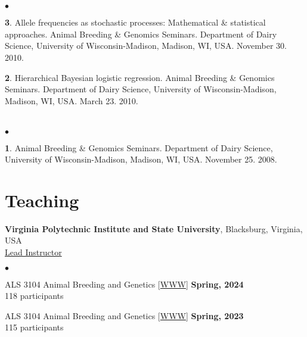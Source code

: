 \documentclass[margin,line,10pt]{res}
\newenvironment{list2}{
  \begin{list}{$\bullet$}{%
      \setlength{\itemsep}{0in}
      \setlength{\parsep}{0in} \setlength{\parskip}{0in}
      \setlength{\topsep}{0in} \setlength{\partopsep}{0in} 
      \setlength{\leftmargin}{0.2in}}}{\end{list}}
\begin{document}
\begin{resume}
\section{}
\begin{list2}
\item [{\bf 3}.] Allele frequencies as stochastic processes: Mathematical \& statistical approaches. Animal Breeding \& Genomics Seminars.  Department of Dairy Science, University of Wisconsin-Madison, Madison, WI, USA. November 30. 2010.

\vspace{0.5cm}
\item [{\bf 2}.] Hierarchical Bayesian logistic regression. Animal Breeding \& Genomics Seminars. Department of Dairy Science, University of Wisconsin-Madison, Madison, WI, USA. March 23. 2010.
\end{list2}

\section{}
\begin{list2}
\item  [{\bf 1}.] Animal Breeding \& Genomics Seminars.  Department of Dairy Science, University of Wisconsin-Madison, Madison, WI, USA. November 25. 2008. 
\end{list2}




\vspace{0.5cm}
\section{\sc Teaching}
{\bf Virginia Polytechnic Institute and State University}, Blacksburg, Virginia, USA  \vspace{0.2cm} \\
\underline{Lead Instructor}
\vspace{0.4cm}
\begin{list2}


  \item ALS 3104 Animal Breeding and Genetics [\textcolor{blue}{\href{http://morotalab.org/als3104-2022/ALS3104.html}{WWW}}] 
  \hfill {\bf Spring, 2024} \\
         118  participants 
  
         \vspace{0.5cm}


  \item ALS 3104 Animal Breeding and Genetics [\textcolor{blue}{\href{http://morotalab.org/als3104-2022/ALS3104.html}{WWW}}] 
  \hfill {\bf Spring, 2023} \\
         115  participants 
  

\end{list2}
\end{resume}
\end{document}
